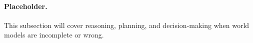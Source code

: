 \paragraph{Placeholder.}
This subsection will cover reasoning, planning, and decision-making when world models are incomplete or wrong.
